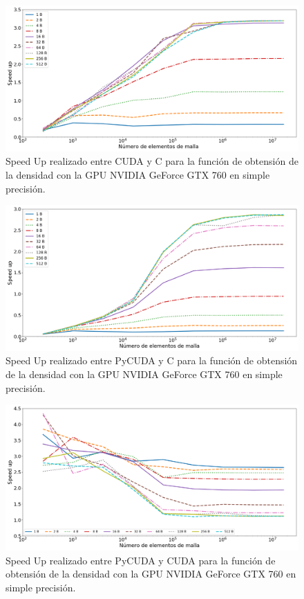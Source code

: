 \begin{figure}[h!]
	\centering
	\includegraphics[width=\textwidth]{figs/cap4/s_cuda_760_test_simple_10}
	\caption{Speed Up realizado entre CUDA y C para la función de obtensión de la densidad con la GPU NVIDIA GeForce GTX 760 en simple precisión.} 
	\label{fig:s_cuda_760_test_simple_10}	
\end{figure}

\begin{figure}[h!]
	\centering
	\includegraphics[width=\textwidth]{figs/cap4/s_py_c_760_test_simple_10}
	\caption{Speed Up realizado entre PyCUDA y C para la función de obtensión de la densidad con la GPU NVIDIA GeForce GTX 760 en simple precisión.} 
	\label{fig:s_py_c_760_test_simple_10}	
\end{figure}


\begin{figure}[h!]
	\centering
	\includegraphics[width=\textwidth]{figs/cap4/s_py_760_test_simple_10}
	\caption{Speed Up realizado entre PyCUDA y CUDA para la función de obtensión de la densidad con la GPU NVIDIA GeForce GTX 760 en simple precisión.} 
	\label{fig:s_py_760_test_simple_10}	
\end{figure}



